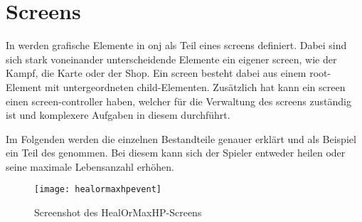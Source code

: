 \renewcommand{\kapitelautor}{Autor: Felix Zwickelstorfer}
\section{Screens}\label{sec:screens}
\renewcommand{\kapitelautor}{Autor: Felix Zwickelstorfer}
In \FF werden grafische Elemente in onj als Teil eines screens definiert.
Dabei sind sich stark voneinander unterscheidende Elemente ein eigener screen, wie \zB der Kampf, die Karte oder der Shop.
Ein screen besteht dabei aus einem root-Element mit untergeordneten child-Elementen.
Zusätzlich hat kann ein screen einen screen-controller haben, welcher für die Verwaltung des screens zuständig ist und komplexere Aufgaben in diesem durchführt.

Im Folgenden werden die einzelnen Bestandteile genauer erklärt und als Beispiel ein Teil des   genommen.
Bei diesem kann sich der Spieler entweder heilen oder seine maximale Lebensanzahl erhöhen.
\begin{figure}[H]
    \centering
    \texttt{[image: healormaxhpevent]}
    \caption{Screenshot des HealOrMaxHP-Screens}
\end{figure}




